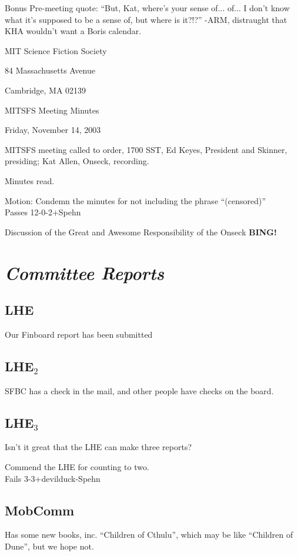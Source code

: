\documentclass[10pt]{article}
\newcommand{\bing}{{\bf BING!} }
\newcommand{\goto}[1]{\bing \vskip 12pt \section*{{\em{#1}}}}
\begin{document}
Bonus Pre-meeting quote: ``But, Kat, where's your sense of... of... I don't know what it's
  supposed to be a sense of, but where is it?!?'' -ARM, distraught
  that KHA wouldn't want a Boris calendar.
\begin{center}

MIT Science Fiction Society 

84 Massachusetts Avenue

Cambridge, MA 02139

\vspace{12pt}

MITSFS Meeting Minutes 

Friday, November 14, 2003

\end{center}
 
\vspace{18pt}

\setlength{\parskip}{6pt}

\noindent
MITSFS meeting called to order, 1700 SST, Ed Keyes, President and
Skinner, presiding; Kat Allen,  Onseck, recording.

Minutes read.

Motion: Condemn the minutes for not including the phrase
``(censored)''\\
Passes 12-0-2+Spehn

Discussion of the Great and Awesome Responsibility of the Onseck
\goto{Committee Reports}
\subsection*{LHE}
Our Finboard report has been submitted
\subsection*{LHE$_2$}
SFBC has a check in the mail, and other people have checks on the board.
\subsection*{LHE$_3$}
Isn't it great that the LHE can make three reports?

Commend the LHE for counting to two.\\
Fails 3-3+devilduck-Spehn

\subsection*{MobComm}
Has some new books, inc. ``Children of Cthulu'', which may be like
``Children of Dune'', but we hope not.
\end{document}
